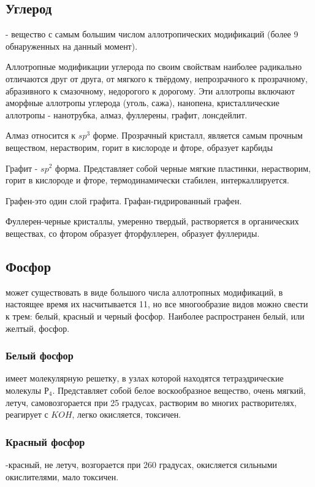 \documentclass[11pt]{article}
\begin{document}
\subsection{Углерод} - вещество с самым большим числом аллотропических
модификаций (более 9 обнаруженных на данный момент).

Аллотропные модификации углерода по своим свойствам наиболее радикально
отличаются друг от друга, от мягкого к твёрдому, непрозрачного к прозрачному,
абразивного к смазочному, недорогого к дорогому. Эти аллотропы включают
аморфные аллотропы углерода (уголь, сажа), нанопена, кристаллические
аллотропы - нанотрубка, алмаз, фуллерены, графит, лонсдейлит.

Алмаз относится к $sp^3$ форме. Прозрачный кристалл, является самым прочным
веществом, нерастворим, горит в кислороде и фторе, образует карбиды

Графит - $sp^2$ форма. Представляет собой черные мягкие пластинки, нерастворим,
горит в кислороде и фторе, термодинамически стабилен, интеркаллируется.

Графен-это один слой графита. Графан-гидрированный графен.

Фуллерен-черные кристаллы, умеренно твердый, растворяется в органических
веществах, со фтором образует фторфуллерен, образует фуллериды.

\subsection{Фосфор} может существовать в виде большого числа аллотропных
модификаций, в настоящее время их насчитывается 11, но все многообразие видов
можно свести к трем: белый, красный и черный фосфор.
Hаиболее распространен белый, или желтый, фосфор.
\subsubsection{Белый фосфор} имеет молекулярную решетку, в узлах которой находятся
тетраэдрические молекулы $Р_4$. Представляет собой белое воскообразное
вещество, очень мягкий, летуч, самовозгорается при 25 градусах, растворим во
многих растворителях, реагирует с $KOH$, легко окисляется, токсичен.

\subsubsection{Красный фосфор}-красный, не летуч, возгорается при 260 градусах, окисляется
сильными окислителями, мало токсичен.
\end{document}

